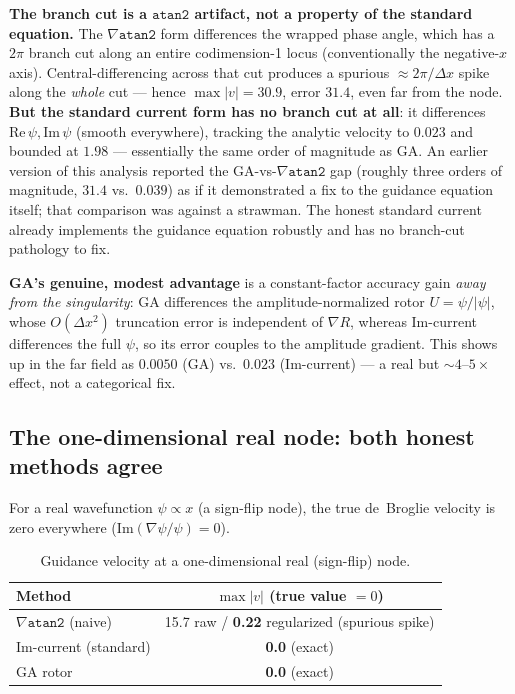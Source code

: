\documentclass[11pt]{article}
\begin{document}
\textbf{The branch cut is a $\mathtt{atan2}$ artifact, not a property of the standard equation.} The $\nabla\mathtt{atan2}$ form differences the wrapped phase angle, which has a $2\pi$ branch cut along an entire codimension-1 locus (conventionally the negative-$x$ axis). Central-differencing across that cut produces a spurious $\approx2\pi/\Delta x$ spike along the \emph{whole} cut — hence $\max|v|=30.9$, error $31.4$, even far from the node. \textbf{But the standard current form has no branch cut at all}: it differences $\mathrm{Re}\,\psi,\mathrm{Im}\,\psi$ (smooth everywhere), tracking the analytic velocity to $0.023$ and bounded at $1.98$ — essentially the same order of magnitude as GA. An earlier version of this analysis reported the GA-vs-$\nabla\mathtt{atan2}$ gap (roughly three orders of magnitude, $31.4$ vs.\ $0.039$) as if it demonstrated a fix to the guidance equation itself; that comparison was against a strawman. The honest standard current already implements the guidance equation robustly and has no branch-cut pathology to fix.

\textbf{GA's genuine, modest advantage} is a constant-factor accuracy gain \emph{away from the singularity}: GA differences the amplitude-normalized rotor $U=\psi/|\psi|$, whose $O(\Delta x^2)$ truncation error is independent of $\nabla R$, whereas Im-current differences the full $\psi$, so its error couples to the amplitude gradient. This shows up in the far field as $0.0050$ (GA) vs.\ $0.023$ (Im-current) — a real but $\sim\!4$--$5\times$ effect, not a categorical fix.

\subsection{The one-dimensional real node: both honest methods agree}

For a real wavefunction $\psi\propto x$ (a sign-flip node), the true de~Broglie velocity is zero everywhere ($\mathrm{Im}(\nabla\psi/\psi)=0$).

\begin{table}[h]
\centering
\begin{tabular}{@{}lc@{}}
\toprule
Method & $\max|v|$ (true value $=0$) \\
\midrule
$\nabla\mathtt{atan2}$ (naive) & 15.7 raw / \textbf{0.22} regularized (spurious spike) \\
Im-current (standard) & \textbf{0.0} (exact) \\
GA rotor & \textbf{0.0} (exact) \\
\bottomrule
\end{tabular}
\caption{Guidance velocity at a one-dimensional real (sign-flip) node.}
\label{tab:realnode}
\end{table}
\end{document}

